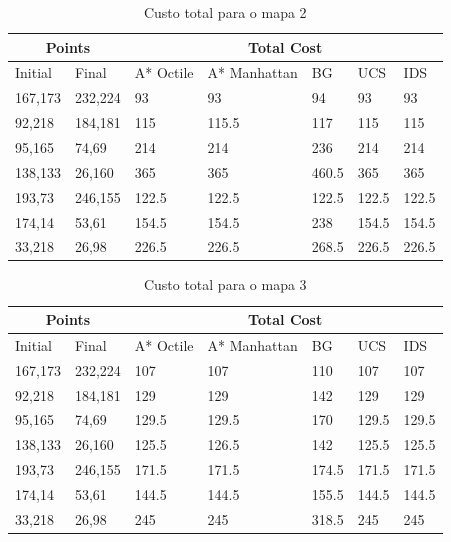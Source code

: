 \begin{table}[htbp]
\centering
\caption{Custo total para o mapa 2}
\label{tab:total-costs-2}
\begin{tabular}{ll|lllll}
\multicolumn{2}{c|}{Points} & \multicolumn{5}{c}{Total Cost}\\ \hline
Initial & Final & A* Octile & A* Manhattan & BG    & UCS   & IDS   \\ \hline
167,173       & 232,224     & 93        & 93           & 94    & 93    & 93    \\
92,218        & 184,181     & 115       & 115.5        & 117   & 115   & 115   \\
95,165        & 74,69       & 214       & 214          & 236   & 214   & 214   \\
138,133       & 26,160      & 365       & 365          & 460.5 & 365   & 365   \\
193,73        & 246,155     & 122.5     & 122.5        & 122.5 & 122.5 & 122.5 \\
174,14        & 53,61       & 154.5     & 154.5        & 238   & 154.5 & 154.5 \\
33,218        & 26,98       & 226.5     & 226.5        & 268.5 & 226.5 & 226.5
\end{tabular}
\end{table}

\begin{table}[htbp]
\centering
\caption{Custo total para o mapa 3}
\label{tab:total-costs-3}
\begin{tabular}{ll|lllll}
\multicolumn{2}{c|}{Points} & \multicolumn{5}{c}{Total Cost}      \\ \hline
Initial & Final & A* Octile & A* Manhattan & BG    & UCS   & IDS  \\ \hline
167,173       & 232,224     & 107       & 107          & 110   & 107   & 107   \\
92,218        & 184,181     & 129       & 129          & 142   & 129   & 129   \\
95,165        & 74,69       & 129.5     & 129.5        & 170   & 129.5 & 129.5 \\
138,133       & 26,160      & 125.5     & 126.5        & 142   & 125.5 & 125.5 \\
193,73        & 246,155     & 171.5     & 171.5        & 174.5 & 171.5 & 171.5 \\
174,14        & 53,61       & 144.5     & 144.5        & 155.5 & 144.5 & 144.5 \\
33,218        & 26,98       & 245       & 245          & 318.5 & 245   & 245  
\end{tabular}
\end{table}

